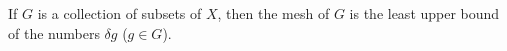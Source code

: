 If $G$ is a collection of subsets of $X$, then the mesh of $G$ is the least upper bound of the numbers $\delta g$ ($g \in G$).
